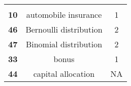 \documentclass[]{book}
\theoremstyle{definition}
\theoremstyle{definition}
\theoremstyle{definition}
\theoremstyle{remark}
\begin{document}
\begin{longtable}[]{@{}ccc@{}}
\begin{minipage}[t]{0.29\columnwidth}
\end{minipage}\tabularnewline
\begin{minipage}[t]{0.11\columnwidth}\centering\strut
\textbf{10}\strut
\end{minipage} & \begin{minipage}[t]{0.42\columnwidth}\centering\strut
automobile insurance\strut
\end{minipage} & \begin{minipage}[t]{0.29\columnwidth}\centering\strut
1\strut
\end{minipage}\tabularnewline
\begin{minipage}[t]{0.11\columnwidth}\centering\strut
\textbf{46}\strut
\end{minipage} & \begin{minipage}[t]{0.42\columnwidth}\centering\strut
Bernoulli distribution\strut
\end{minipage} & \begin{minipage}[t]{0.29\columnwidth}\centering\strut
2\strut
\end{minipage}\tabularnewline
\begin{minipage}[t]{0.11\columnwidth}\centering\strut
\textbf{47}\strut
\end{minipage} & \begin{minipage}[t]{0.42\columnwidth}\centering\strut
Binomial distribution\strut
\end{minipage} & \begin{minipage}[t]{0.29\columnwidth}\centering\strut
2\strut
\end{minipage}\tabularnewline
\begin{minipage}[t]{0.11\columnwidth}\centering\strut
\textbf{33}\strut
\end{minipage} & \begin{minipage}[t]{0.42\columnwidth}\centering\strut
bonus\strut
\end{minipage} & \begin{minipage}[t]{0.29\columnwidth}\centering\strut
1\strut
\end{minipage}\tabularnewline
\begin{minipage}[t]{0.11\columnwidth}\centering\strut
\textbf{44}\strut
\end{minipage} & \begin{minipage}[t]{0.42\columnwidth}\centering\strut
capital allocation\strut
\end{minipage} & \begin{minipage}[t]{0.29\columnwidth}\centering\strut
NA\strut
\end{minipage}\tabularnewline

\end{longtable}
\end{document}

